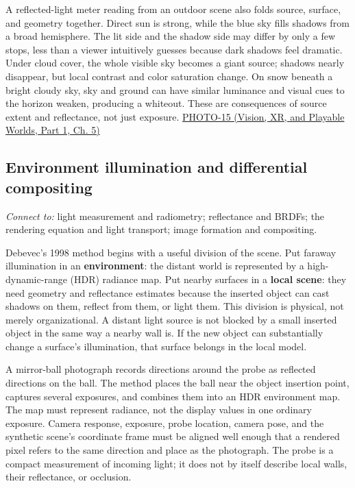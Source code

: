A reflected-light meter reading from an outdoor scene also folds source, surface, and geometry together. Direct sun is strong, while the blue sky fills shadows from a broad hemisphere. The lit side and the shadow side may differ by only a few stops, less than a viewer intuitively guesses because dark shadows feel dramatic. Under cloud cover, the whole visible sky becomes a giant source; shadows nearly disappear, but local contrast and color saturation change. On snow beneath a bright cloudy sky, sky and ground can have similar luminance and visual cues to the horizon weaken, producing a whiteout. These are consequences of source extent and reflectance, not just exposure. \href{../07-Vision-XR-and-Playable-Worlds-P01/main.pdf\#nameddest=04-visual-computing-ii-ch036-photo-15---photography-session-15}{PHOTO-15 (Vision, XR, and Playable Worlds, Part 1, Ch. 5)}

\subsection{Environment illumination and differential compositing}\label{03-visual-computing-i-ch004-environment-illumination-and-differential-compositing}

\hypertarget{03-visual-computing-i-ch004-environment-illumination-and-differential-compositing}{}

\emph{Connect to:} light measurement and radiometry; reflectance and BRDFs; the rendering equation and light transport; image formation and compositing.

Debevec's 1998 method begins with a useful division of the scene. Put faraway illumination in an \textbf{environment}: the distant world is represented by a high-dynamic-range (HDR) radiance map. Put nearby surfaces in a \textbf{local scene}: they need geometry and reflectance estimates because the inserted object can cast shadows on them, reflect from them, or light them. This division is physical, not merely organizational. A distant light source is not blocked by a small inserted object in the same way a nearby wall is. If the new object can substantially change a surface's illumination, that surface belongs in the local model.

A mirror-ball photograph records directions around the probe as reflected directions on the ball. The method places the ball near the object insertion point, captures several exposures, and combines them into an HDR environment map. The map must represent radiance, not the display values in one ordinary exposure. Camera response, exposure, probe location, camera pose, and the synthetic scene's coordinate frame must be aligned well enough that a rendered pixel refers to the same direction and place as the photograph. The probe is a compact measurement of incoming light; it does not by itself describe local walls, their reflectance, or occlusion.

